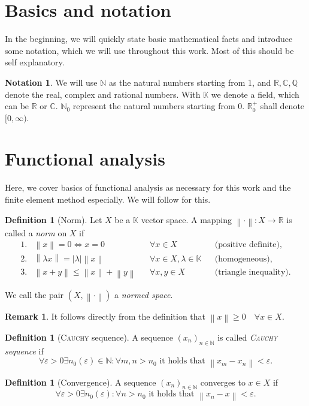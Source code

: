 \documentclass[12pt,a4paper,twoside, open=right]{scrreprt}
\theoremstyle{definition}
\newtheorem{rem}[auf]{Remark}
\newtheorem{defn}[auf]{Definition}
\newtheorem{notation}[auf]{Notation}
\theoremstyle{plain}
\newcommand{\abs}[1]{\left\vert #1\right\vert}
\newcommand{\rr}{\mathbb{R}}
\newcommand{\cc}{\mathbb{C}}
\newcommand{\kk}{\mathbb{K}}
\newcommand{\nn}{\mathbb{N}}
\newcommand{\qq}{\mathbb{Q}}
\newcommand{\norm}[1]{\left\lVert#1\right\rVert}
\begin{document}
\section{Basics and notation}
In the beginning, we will quickly state basic mathematical facts and introduce some notation, which we will use throughout this work. Most of this should be self explanatory.
\begin{notation}
    We will use $\nn$ as the natural numbers starting from 1, and $\rr,\cc,\qq$ denote the real, complex and rational numbers. With $\kk$ we denote a field, which can be $\rr$ or $\cc$. $\nn_0$ represent the natural numbers starting from 0. $\rr^+_0$ shall denote $[0,\infty)$.
\end{notation} 
\section{Functional analysis}
\label{sec:funcana}
Here, we cover basics of functional analysis as necessary for this work and the finite element method especially. We will follow \cite{Ganesan2017} for this.
\begin{defn}[Norm]
    Let $X$ be a $\kk$ vector space. A mapping $\norm{\cdot}\colon X\to\rr$ is called a \emph{norm} on $X$ if 
    \begin{align}
        1. &\norm{x}=0 \Leftrightarrow x=0 &&\forall x\in X  &&\text{(positive definite)},\\
        2. &\norm{\lambda x}=\abs{\lambda}\norm{x} &&\forall x\in X,\lambda\in\kk &&\text{(homogeneous)},\\
        3. &\norm{x+y}\le\norm{x}+\norm{y}&&\forall x,y\in X &&\text{(triangle inequality)}.
    \end{align}

    We call the pair $(X,\norm{\cdot})$ a \emph{normed space}.
\end{defn}
\begin{rem}
    It follows directly from the definition that $\norm{x}\ge 0 \quad\forall x\in X$.
\end{rem}
\begin{defn}[\textsc{Cauchy} sequence]
    A sequence $(x_n)_{n\in\nn}$ is called \emph{\textsc{Cauchy} sequence} if
    \begin{equation}
         \forall\varepsilon>0 \exists n_0(\varepsilon)\in\nn\colon \forall m,n>n_0\text{ it holds that }\norm{x_m-x_n}<\varepsilon.
    \end{equation}
\end{defn}
\begin{defn}[Convergence]
    A sequence $(x_n)_{n\in\nn}$ converges to $x\in X$ if 
    \begin{equation}
        \forall\varepsilon>0 \exists n_0(\varepsilon)\colon \forall n>n_0 \text{ it holds that } \norm{x_n -x}<\varepsilon.
    \end{equation}
\end{defn}
\end{document}

